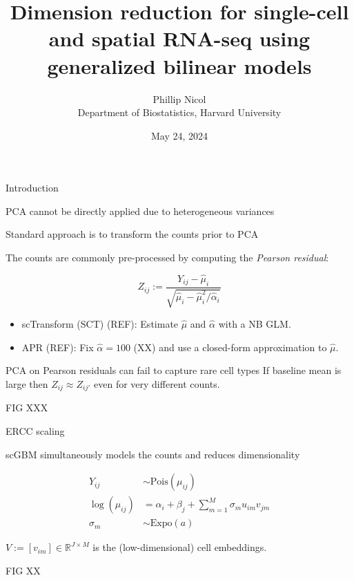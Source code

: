 \documentclass[aspectratio=43]{beamer}
\title{Dimension reduction for single-cell and spatial RNA-seq using generalized bilinear models}
\author{\texorpdfstring{Phillip Nicol \\ Department of Biostatistics, Harvard University}{}}
\institute{NESS 2024 (Storrs, CT)}
\date{May 24, 2024}
\newcommand{\R}{\mathbb{R}}
\begin{document}
\titlepage

\begin{frame}{Introduction}

\end{frame}

\begin{frame}{PCA cannot be directly applied due to heterogeneous variances}

\end{frame}

\begin{frame}{Standard approach is to transform the counts prior to PCA}

The counts are commonly pre-processed by computing the \textit{Pearson residual}:

\begin{equation}
Z_{ij} := \frac{Y_{ij} - \hat{\mu}_{i}}{\sqrt{ \hat{\mu}_{i} - \hat{\mu}_{i}^2 / \hat{\alpha}_i}}
\end{equation}

\begin{itemize}
\item scTransform (SCT) (REF): Estimate $\hat{\mu}$ and $\hat{\alpha}$ with a NB GLM.
\item APR (REF): Fix $\hat{\alpha} = 100$ (XX) and use a closed-form approximation to $\hat{\mu}$. 
\end{itemize}
\end{frame}

\begin{frame}{PCA on Pearson residuals can fail to capture rare cell types}
If baseline mean is large then $Z_{ij} \approx Z_{ij'}$ even for very different counts.

FIG XXX 
\end{frame}

\begin{frame}{ERCC scaling}

\end{frame}

\begin{frame}{scGBM simultaneously models the counts and reduces dimensionality}

\begin{equation}
\begin{split}
Y_{ij} &\sim \text{Pois}(\mu_{ij}) \\
\log(\mu_{ij}) &= \alpha_i + \beta_j + \sum_{m=1}^M \sigma_m u_{im} v_{jm} \\
\sigma_m &\sim \text{Expo}(a)
\end{split}
\end{equation}

$V := [v_{im}] \in \R^{J \times M}$ is the (low-dimensional) cell embeddings.


FIG XX 
\end{frame}
\end{document}
